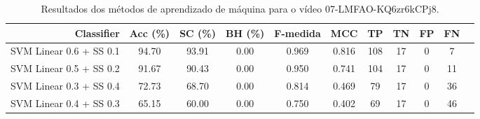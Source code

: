 \begin{table}[!htb]
\centering
\caption{Resultados dos métodos de aprendizado de máquina para o vídeo 07-LMFAO-KQ6zr6kCPj8.}
\label{tab:07-LMFAO-KQ6zr6kCPj8}
\begin{tabular}{r|c|c|c|c|c|c|c|c|c|c}
\hline\hline
Classifier & Acc (\%) & SC (\%) & BH (\%) & F-medida & MCC & TP & TN & FP & FN \\ \hline
SVM Linear 0.6 + SS 0.1 & 94.70 & 93.91 & 0.00 & 0.969 & 0.816 & 108 & 17 & 0 & 7 \\ 
SVM Linear 0.5 + SS 0.2 & 91.67 & 90.43 & 0.00 & 0.950 & 0.741 & 104 & 17 & 0 & 11 \\ 
SVM Linear 0.3 + SS 0.4 & 72.73 & 68.70 & 0.00 & 0.814 & 0.469 & 79 & 17 & 0 & 36 \\ 
SVM Linear 0.4 + SS 0.3 & 65.15 & 60.00 & 0.00 & 0.750 & 0.402 & 69 & 17 & 0 & 46 \\ 
\hline\hline
\end{tabular}
\end{table}
